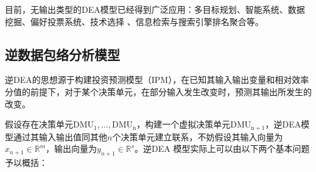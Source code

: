 目前，无输出类型的DEA模型已经得到广泛应用：多目标规划\cite{ramanathan2006data,wang2009new}、智能系统\cite{wang2008integrated,pendharkar2005data}、数据挖掘\cite{chen2007ranking}、偏好投票系统\cite{cook1990data,llamazares2009preference}、技术选择
\cite{ertugrul2008improved,amin2008note,amin2009optimal}、信息检索与搜索引擎排名聚合\cite{amin2009finding}等。

\subsection{逆数据包络分析模型}
逆DEA的思想源于构建投资预测模型（IPM）\cite{zhang1999project,wei2000inverse}，在已知其输入输出变量和相对效率分值的前提下，对于某个决策单元，在部分输入发生改变时，预测其输出所发生的改变。

假设存在决策单元$\mathrm{DMU_1}, \ldots, \mathrm{DMU_n}$，构建一个虚拟决策单元$\mathrm{DMU_{n+1}}$，逆DEA模型通过其输入输出值同其他$n$个决策单元建立联系，不妨假设其输入向量为$x_{n+1}\in \mathbb{R}^m$，输出向量为$y_{n+1}\in \mathbb{R}^s$。逆DEA 模型实际上可以由以下两个基本问题予以概括\cite{li2003dea}：
